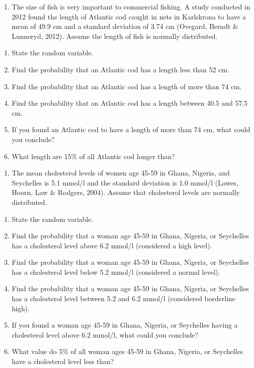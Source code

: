 \documentclass[]{book}
\providecommand{\tightlist}{%
  \setlength{\itemsep}{0pt}\setlength{\parskip}{0pt}}
\begin{document}
\begin{enumerate}
\def\labelenumi{\arabic{enumi}.}
\setcounter{enumi}{4}
\tightlist
\item
  The size of fish is very important to commercial fishing. A study conducted in 2012 found the length of Atlantic cod caught in nets in Karlskrona to have a mean of 49.9 cm and a standard deviation of 3.74 cm (Ovegard, Berndt \& Lunneryd, 2012). Assume the length of fish is normally distributed.
\end{enumerate}

\begin{enumerate}
\def\labelenumi{\alph{enumi}.}
\tightlist
\item
  State the random variable.
\item
  Find the probability that an Atlantic cod has a length less than 52 cm.
\item
  Find the probability that an Atlantic cod has a length of more than 74 cm.
\item
  Find the probability that an Atlantic cod has a length between 40.5 and 57.5 cm.
\item
  If you found an Atlantic cod to have a length of more than 74 cm, what could you conclude?
\item
  What length are 15\% of all Atlantic cod longer than?
\end{enumerate}

\begin{enumerate}
\def\labelenumi{\arabic{enumi}.}
\setcounter{enumi}{5}
\tightlist
\item
  The mean cholesterol levels of women age 45-59 in Ghana, Nigeria, and Seychelles is 5.1 mmol/l and the standard deviation is 1.0 mmol/l (Lawes, Hoorn, Law \& Rodgers, 2004). Assume that cholesterol levels are normally distributed.
\end{enumerate}

\begin{enumerate}
\def\labelenumi{\alph{enumi}.}
\tightlist
\item
  State the random variable.
\item
  Find the probability that a woman age 45-59 in Ghana, Nigeria, or Seychelles has a cholesterol level above 6.2 mmol/l (considered a high level).
\item
  Find the probability that a woman age 45-59 in Ghana, Nigeria, or Seychelles has a cholesterol level below 5.2 mmol/l (considered a normal level).
\item
  Find the probability that a woman age 45-59 in Ghana, Nigeria, or Seychelles has a cholesterol level between 5.2 and 6.2 mmol/l (considered borderline high).
\item
  If you found a woman age 45-59 in Ghana, Nigeria, or Seychelles having a cholesterol level above 6.2 mmol/l, what could you conclude?
\item
  What value do 5\% of all woman ages 45-59 in Ghana, Nigeria, or Seychelles have a cholesterol level less than?
\end{enumerate}
\end{document}
